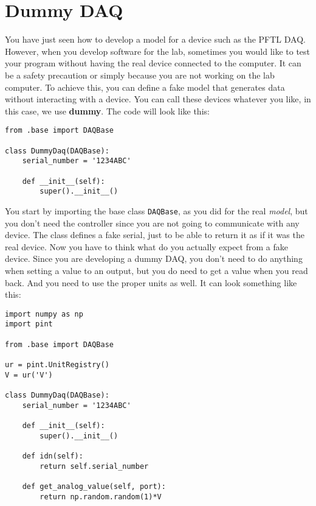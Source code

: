 
\section{Dummy DAQ}\label{dummy-daq}
You have just seen how to develop a model for a device such as the
{PFTL} {DAQ}. However, when you develop software for the lab, sometimes
you would like to test your program without having the real device
connected to the computer. It can be a safety precaution or simply
because you are not working on the lab computer. To achieve this, you
can define a fake model that generates data without interacting with a
device. You can call these devices whatever you like, in this case, we
use \textbf{dummy}. The code will look like this:

\begin{verbatim}
from .base import DAQBase

class DummyDaq(DAQBase):
    serial_number = '1234ABC'
    
    def __init__(self):
        super().__init__()
\end{verbatim}

You start by importing the base class \texttt{DAQBase}, as you did for
the real \emph{model}, but you don't need the controller since you are
not going to communicate with any device. The class defines a fake
serial, just to be able to return it as if it was the real device. Now
you have to think what do you actually expect from a fake device. Since
you are developing a dummy {DAQ}, you don't need to do anything when
setting a value to an output, but you do need to get a value when you
read back. And you need to use the proper units as well. It can look
something like this:

\begin{verbatim}
import numpy as np
import pint

from .base import DAQBase

ur = pint.UnitRegistry()
V = ur('V')

class DummyDaq(DAQBase):
    serial_number = '1234ABC'
    
    def __init__(self):
        super().__init__()
    
    def idn(self):
        return self.serial_number
    
    def get_analog_value(self, port):
        return np.random.random(1)*V
\end{verbatim}


